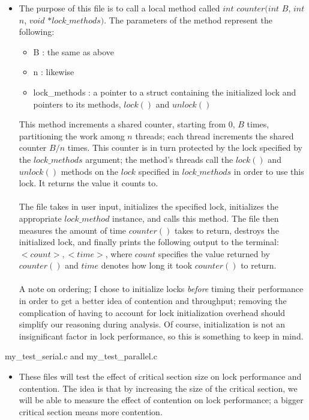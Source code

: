 \documentclass[]{article}
\begin{document}
\begin{itemize}
\begin{itemize}
\begin{itemize}
		\end{itemize}
		\item The purpose of this file is to call a local method called $int$ $ counter($$int$ $B$, $int$ $n$, $void$ $*lock\_methods)$. The parameters of the method represent the following:
		\begin{itemize}
			\item B : the same as above
			\item n : likewise
			\item lock\_methods : a pointer to a struct containing the initialized lock and pointers to its methods, $lock()$ and $unlock()$
		\end{itemize}
		This method increments a shared counter, starting from 0, $B$ times, partitioning the work among $n$ threads; each thread increments the shared counter $B / n$ times. This counter is in turn protected by the lock specified by the $lock\_methods$ argument; the method's threads call the $lock()$ and $unlock()$ methods on the $lock$ specified in $lock\_methods$ in order to use this lock. It returns the value it counts to. 
		\\\\
		The file takes in user input, initializes the specified lock, initializes the appropriate $lock\_method$ instance, and calls this method. The file then measures the amount of time $counter()$ takes to return, destroys the initialized lock, and finally prints the following output to the terminal: $<count>,<time>$, where $count$ specifies the value returned by $counter()$ and $time$ denotes how long it took $counter()$ to return.
		\\\\
		A note on ordering; I chose to initialize locks \textit{before} timing their performance in order to get a better idea of contention and throughput; removing the complication of having to account for lock initialization overhead should simplify our reasoning during analysis. Of course, initialization is not an insignificant factor in lock performance, so this is something to keep in mind.
	\end{itemize}
	my\_test\_serial.c and my\_test\_parallel.c 
	\begin{itemize}
		\item These files will test the effect of critical section size on lock performance and contention. The idea is that by increasing the size of the critical section, we will be able to measure the effect of contention on lock performance; a bigger critical section means more contention.

\end{itemize}
\end{itemize}
\end{document}
